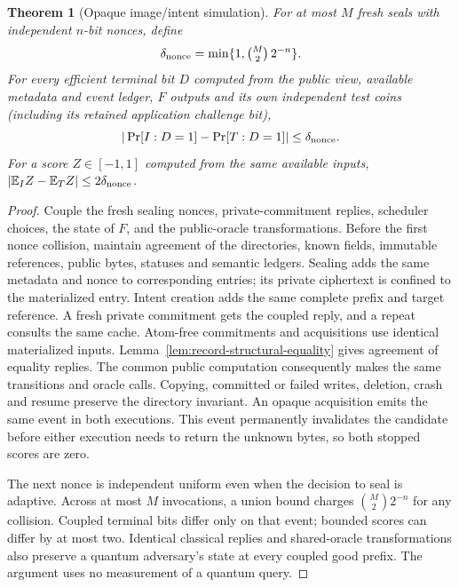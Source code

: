 \documentclass[pdflatex]{sn-jnl}
\theoremstyle{thmstyleone}
\newtheorem{theorem}{Theorem}[section]
\theoremstyle{thmstylethree}
\theoremstyle{thmstyletwo}
\begin{document}
\begin{theorem}[Opaque image/intent simulation]
\label{thm:opaque-rendering}
For at most $M$ fresh seals with independent $n$-bit nonces, define
\[
 \delta_{\rm nonce}=\min\{1,\tbinom M2\,2^{-n}\}.
\]
For every efficient terminal bit $D$ computed from the public view, available
metadata and event ledger, $F$ outputs and its own independent test coins
(including its retained application challenge bit),
\[
  |\Pr[I:D=1]-\Pr[T:D=1]|\leq\delta_{\rm nonce}.
\]
For a score $Z\in[-1,1]$ computed from the same available inputs,
$|\mathbb E_I Z-\mathbb E_T Z|\leq2\delta_{\rm nonce}$.
\end{theorem}
\begin{proof}
Couple the fresh sealing nonces, private-commitment replies, scheduler choices,
the state of $F$, and the public-oracle transformations. Before the first
nonce collision, maintain agreement of the directories, known fields,
immutable references, public bytes, statuses and semantic ledgers.
Sealing adds the same metadata and nonce to corresponding entries; its
private ciphertext is confined to the materialized entry. Intent creation
adds the same complete prefix and target reference. A fresh private
commitment gets the coupled reply, and a repeat consults the same cache.
Atom-free commitments and acquisitions use identical materialized inputs.
Lemma~\ref{lem:record-structural-equality} gives agreement of equality replies.
The common public computation consequently makes the same transitions and
oracle calls. Copying, committed or failed writes, deletion, crash and
resume preserve the directory invariant. An opaque acquisition emits the
same event in both executions. This event permanently invalidates the
candidate before either execution needs to return the unknown bytes, so
both stopped scores are zero.

The next nonce is independent uniform even when the decision to seal is
adaptive. Across at most $M$ invocations, a union bound charges
$\binom M2 2^{-n}$ for any collision. Coupled terminal bits differ only on
that event; bounded scores can differ by at most two. Identical classical
replies and shared-oracle transformations also preserve a quantum
adversary's state at every coupled good prefix. The argument uses no
measurement of a quantum query.
\end{proof}
\end{document}

